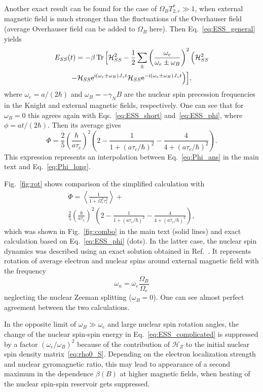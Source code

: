 \documentclass[prl,nobibnotes,twocolumn,aps,longbibliography,superscriptaddress,notoc]{revtex4-1}
\newcommand{\Tr}{\mathop{\rm Tr}}
\newcommand{\e}{\mathrm{e}}
\renewcommand{\i}{{\rm i}}
\begin{document}
Another exact result can be found for the case of $\Omega_BT_{2,e}^*\gg1$, when external magnetic field is much stronger than the fluctuations of the Overhauser field (average Overhauser field can be added to $\Omega_B$ here). Then Eq.~\eqref{eq:ESS_general} yields
\begin{multline}
  \label{eq:ESS_complicated}
  E_{SS}(t)=-\beta\Tr\Big[\mathcal H_{SS}^2-\frac{1}{2}\sum_\pm\left(\frac{\omega_e}{\omega_e\pm\omega_B}\right)^2\Big(\mathcal H_{SS}^2\\
  -\mathcal H_{SS}\e^{\i(\omega_e\pm\omega_B)J_zt}\mathcal H_{SS}\e^{-\i(\omega_e\pm\omega_B)J_zt}\Big)\Big],
\end{multline}
where $\omega_e=a/(2\hbar)$ and $\omega_B=-\gamma_NB$ are the nuclear spin precession frequencies in the Knight and external magnetic fields, respectively. One can see that for $\omega_B=0$ this agrees again with Eqs.~\eqref{eq:ESS_short} and~\eqref{eq:ESS_phi}, where $\phi=at/(2\hbar)$. Then its average gives
\begin{equation}
  \Phi=\frac{2}{5}\left(\frac{\hbar}{a\tau_c}\right)^2\left(2-\frac{1}{1+(a\tau_c/\hbar)^2}-\frac{4}{4+(a\tau_c/\hbar)^2}\right).
\end{equation}
This expression represents an interpolation between Eq.~\eqref{eq:Phi_ans} in the main text and Eq.~\eqref{eq:Phi_long}.

Fig.~\ref{fig:rot} shows comparison of the simplified calculation with
\begin{multline}
  \label{eq:phi_simple}
  \Phi=
  \left<\frac{1}{1+\Omega_e^2\tau_c^2}\right>+\\
  \frac{2}{5}\left(\frac{\hbar}{a\tau_c}\right)^2\left(2-\frac{1}{1+(a\tau_c/\hbar)^2}-\frac{4}{4+(a\tau_c/\hbar)^2}\right),
\end{multline}
which was shown in Fig.~\ref{fig:combo} in the main text (solid lines) and exact calculation based on Eq.~\eqref{eq:ESS_phi} (dots). In the latter case, the nuclear spin dynamics was described using an exact solution obtained in Ref.~. It represents rotation of average electron and nuclear spins around external magnetic field with the frequency
\begin{equation}
  \label{eq:omega_n}
  \omega_n=\omega_e\frac{\Omega_B}{\Omega_e}
\end{equation}
neglecting the nuclear Zeeman splitting ($\omega_B=0$). One can see almost perfect agreement between the two calculations.

In the opposite limit of $\omega_B\gg\omega_e$ and large nuclear spin rotation angles, the change of the nuclear spin-spin energy in Eq.~\eqref{eq:ESS_complicated} is suppressed by a factor $(\omega_e/\omega_B)^2$ because of the contribution of $\mathcal H_Z$ to the initial nuclear spin density matrix~\eqref{eq:rho0_S}. Depending on the electron localization strength and nuclear gyromagnetic ratio, this may lead to appearance of a second maximum in the dependence $\beta(B)$ at higher magnetic fields, when heating of the nuclear spin-spin reservoir gets suppressed.
\end{document}
